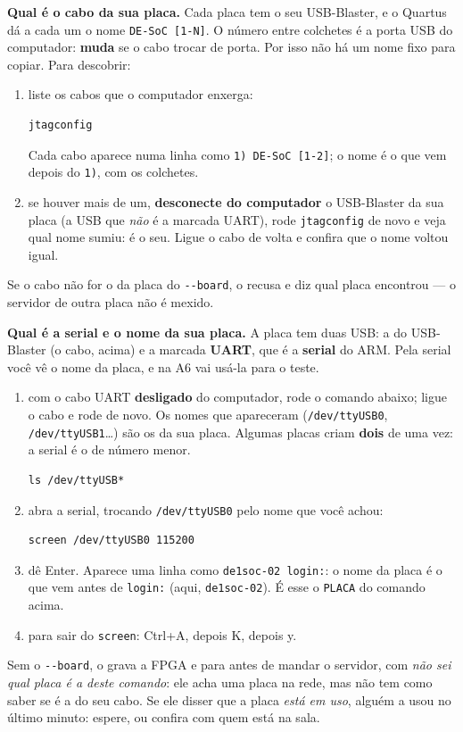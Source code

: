 \documentclass[11pt,a4paper,oneside]{article}
\newcommand{\arq}[1]{{\upshape\ttfamily\detokenize{#1}}}
\begin{document}
\begin{faca}
\textbf{Qual é o cabo da sua placa.} Cada placa tem o seu USB-Blaster, e o
Quartus dá a cada um o nome \texttt{DE-SoC [1-N]}. O número entre colchetes
é a porta USB do computador: \textbf{muda} se o cabo trocar de porta. Por isso
não há um nome fixo para copiar. Para descobrir:
\begin{enumerate}
  \item liste os cabos que o computador enxerga:
\begin{lstlisting}[style=sh]
jtagconfig
\end{lstlisting}
    Cada cabo aparece numa linha como \texttt{1) DE-SoC [1-2]}; o nome é o
    que vem depois do \texttt{1)}, com os colchetes.
  \item se houver mais de um, \textbf{desconecte do computador} o USB-Blaster
    da sua placa (a USB que \emph{não} é a marcada UART), rode
    \texttt{jtagconfig} de novo e veja qual nome sumiu: é o seu. Ligue o
    cabo de volta e confira que o nome voltou igual.
\end{enumerate}
Se o cabo não for o da placa do \texttt{-{}-board}, o \arq{morphe-up.sh}
recusa e diz qual placa encontrou --- o servidor de outra placa não é
mexido.
\end{faca}

\begin{faca}
\textbf{Qual é a serial e o nome da sua placa.} A placa tem duas USB: a do
USB-Blaster (o cabo, acima) e a marcada \textbf{UART}, que é a
\textbf{serial} do ARM. Pela serial você vê o nome da placa, e na A6 vai
usá-la para o teste.
\begin{enumerate}
  \item com o cabo UART \textbf{desligado} do computador, rode o comando
    abaixo; ligue o cabo e rode de novo. Os nomes que apareceram
    (\texttt{/dev/ttyUSB0}, \texttt{/dev/ttyUSB1}\ldots) são os da sua placa.
    Algumas placas criam \textbf{dois} de uma vez: a serial é o de número
    menor.
\begin{lstlisting}[style=sh]
ls /dev/ttyUSB*
\end{lstlisting}
  \item abra a serial, trocando \texttt{/dev/ttyUSB0} pelo nome que você achou:
\begin{lstlisting}[style=sh]
screen /dev/ttyUSB0 115200
\end{lstlisting}
  \item dê Enter. Aparece uma linha como \texttt{de1soc-02 login:}: o nome
    da placa é o que vem antes de \texttt{login:} (aqui, \texttt{de1soc-02}).
    É esse o \texttt{PLACA} do comando acima.
  \item para sair do \texttt{screen}: Ctrl+A, depois K, depois y.
\end{enumerate}
Sem o \texttt{-{}-board}, o \arq{morphe-up.sh} grava a FPGA e para antes de
mandar o servidor, com \emph{não sei qual placa é a deste comando}: ele
acha uma placa na rede, mas não tem como saber se é a do seu cabo. Se ele
disser que a placa \emph{está em uso}, alguém a usou no último minuto:
espere, ou confira com quem está na sala.
\end{faca}
\end{document}
